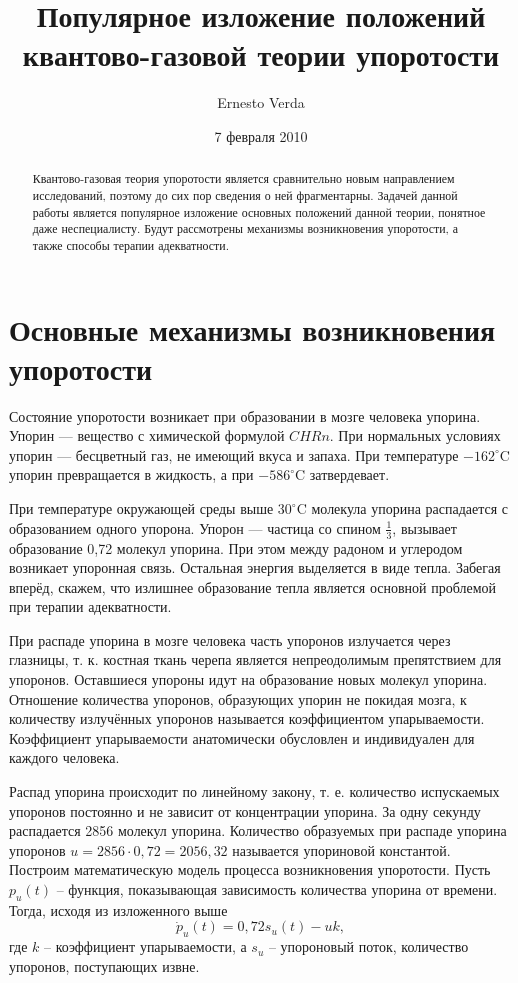 \documentclass[a4paper,12pt]{article}
\title{Популярное изложение положений квантово-газовой теории упоротости}
\author{Ernesto Verda}
\date{7 февраля 2010}
\begin{document}
\maketitle

\begin{abstract}
Квантово-газовая теория упоротости является сравнительно новым направлением исследований, поэтому до сих пор сведения о ней фрагментарны. Задачей данной работы является популярное изложение основных положений данной теории, понятное даже неспециалисту. Будут рассмотрены механизмы возникновения упоротости, а также способы терапии адекватности.
\end{abstract}

\section{Основные механизмы возникновения упоротости}

Состояние упоротости возникает при образовании в мозге человека упорина. Упорин — вещество с химической формулой $CHRn$. При нормальных условиях упорин — бесцветный газ, не имеющий вкуса и запаха. При температуре $-162^\circ$C упорин превращается в жидкость, а при $-586^\circ$C затвердевает.

При температуре окружающей среды выше $30^\circ$C молекула упорина распадается с образованием одного упорона. Упорон — частица со спином $\frac{1}{3}$, вызывает образование 0,72 молекул упорина. При этом между радоном и углеродом возникает упоронная связь. Остальная энергия выделяется в виде тепла. Забегая вперёд, скажем, что излишнее образование тепла является основной проблемой при терапии адекватности.

При распаде упорина в мозге человека часть упоронов излучается через глазницы, т. к. костная ткань черепа является непреодолимым препятствием для упоронов. Оставшиеся упороны идут на образование новых молекул упорина. Отношение количества упоронов, образующих упорин не покидая мозга, к количеству излучённых упоронов называется коэффициентом упарываемости. Коэффициент упарываемости анатомически обусловлен и индивидуален для каждого человека.

Распад упорина происходит по линейному закону, т. е. количество испускаемых упоронов постоянно и не зависит от концентрации упорина. За одну секунду распадается 2856 молекул упорина. Количество образуемых при распаде упорина упоронов $u=2856\cdot 0,72=2056,32$ называется упориновой константой. Построим математическую модель процесса возникновения упоротости. Пусть $p_{u}(t)$ -- функция, показывающая зависимость количества упорина от времени. Тогда, исходя из изложенного выше
\begin{equation}
\dot{p}_{u}(t)=0,72s_{u}(t)-uk,
\end{equation}
где $k$ -- коэффициент упарываемости, а $s_{u}$ -- упороновый поток, количество упоронов, поступающих извне.
\end{document}
